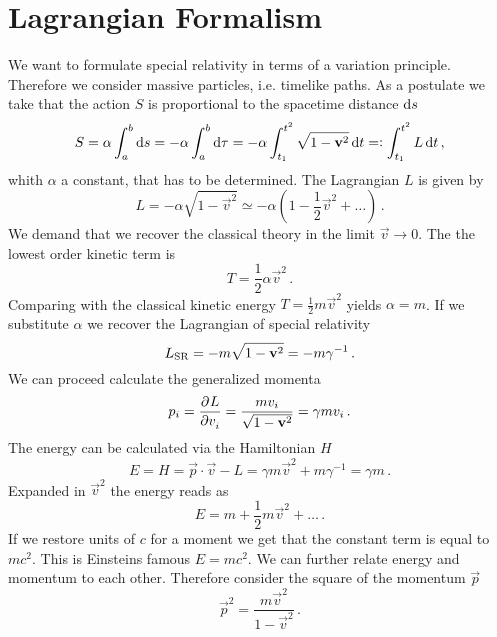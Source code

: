 \section{Lagrangian Formalism}
We want to formulate special relativity in terms of a variation principle.
Therefore we consider massive particles, i.e. timelike paths. As a postulate we
take that the action $S$ is proportional to the spacetime distance $\dif s$
\begin{equation}
    S= \alpha \int_a^b\dif s=- \alpha \int_a^b\dif \tau = -\alpha
    \int_{t_1}^{t^2}\sqrt{1-\vec{v}^2}\dif t =: \int_{t_1}^{t^2}L\dif t\, ,
\end{equation}
whith $\alpha$ a constant, that has to be determined. The Lagrangian $L$ is
given by
\begin{equation}
    L=-\alpha\sqrt{1-\vec{v}^2}\simeq
    -\alpha\left(1-\frac{1}{2}\vec{v}^2+\ldots\right) \, .
\end{equation}
We demand that we recover the classical theory in the limit $\vec{v}\to 0$. The
the lowest order kinetic term is
\begin{equation}
    T=\frac{1}{2}\alpha \vec{v}^2\, .
\end{equation}
Comparing with the classical kinetic energy $T=\frac{1}{2}m\vec{v}^2$ yields
$\alpha=m$. If we substitute $\alpha$ we recover the Lagrangian of special
relativity
\begin{equation}
    L\textsubscript{SR}=-m\sqrt{1-\vec{v}^2}=-m\gamma^{-1}\, .
\end{equation}
We can proceed calculate the generalized momenta
\begin{equation}
    p_i=\dpd{L}{v_i}=\frac{mv_i}{\sqrt{1-\vec{v}^2}}=\gamma m v_i\, .
\end{equation}
The energy can be calculated via the Hamiltonian $H$
\begin{equation}
    E=H=\vec{p}\cdot\vec{v}-L=\gamma m \vec{v}^2 + m\gamma^{-1} =\gamma m\, .
\end{equation}
Expanded in $\vec{v}^2$ the energy reads as
\begin{equation}
    E=m+\frac{1}{2}m\vec{v}^2+\ldots\, .
\end{equation}
If we restore units of $c$ for a moment we get that the constant term is
equal to $mc^2$. This is Einsteins famous $E=mc^2$.
We can further relate energy and momentum to each other. Therefore consider the
square of the momentum $\vec{p}$
\begin{equation}
    \vec{p}^2=\frac{m\vec{v}^2}{1-\vec{v}^2}\, .
\end{equation}
